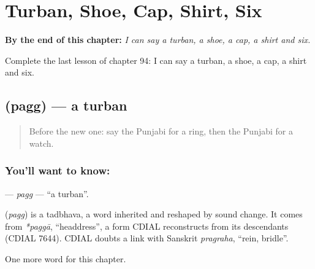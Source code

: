 
\chapter{Turban, Shoe, Cap, Shirt, Six}
\label{ch:pa-turban-shoe-cap-shirt-six}

\begin{chapteropening}
\textbf{By the end of this chapter:} \emph{I can say a turban, a shoe, a cap, a shirt and six.}

Complete the last lesson of chapter 94: I can say a turban, a shoe, a cap, a shirt and six.
\end{chapteropening}

\section[\texorpdfstring{\pa{ਪੱਗ} (pagg)}{ਪੱਗ (pagg)}]{ (pagg) — a turban}

\label{lesson:PA-C94-pagg}



\begin{quote}
Before the new one: say the Punjabi for a ring, then the Punjabi for a watch.
\end{quote}

\subsection*{You'll want to know: }
\textbf{} — \emph{pagg} — \textquotedblleft{}a turban\textquotedblright{}.

\begin{cousinweb}
\textbf{} (\emph{pagg}) is a tadbhava, a word inherited and reshaped by sound change. It comes from \emph{*paggā}, \textquotedblleft{}headdress\textquotedblright{}, a form CDIAL reconstructs from its descendants (CDIAL 7644). CDIAL doubts a link with Sanskrit \emph{pragraha}, \textquotedblleft{}rein, bridle\textquotedblright{}.
\end{cousinweb}

\begin{grammarlens}[title={What you've built}]
One more word for this chapter.
\end{grammarlens}

